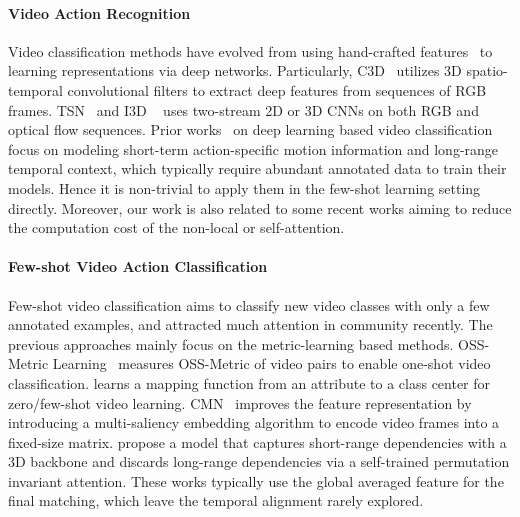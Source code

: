 \documentclass{article}
\begin{document}
\paragraph{Video Action Recognition}
Video classification methods have evolved from using
hand-crafted features~\cite{klaser2008spatio,scovanner20073,wang2013action} to learning representations via deep networks. Particularly,
C3D~\cite{tran2015learning} utilizes 3D spatio-temporal convolutional filters to extract deep features from sequences of RGB frames. TSN~\cite{wang2016temporal} and I3D ~\cite{carreira2017quo} uses two-stream 2D or 3D CNNs on both RGB and optical flow sequences. 
Prior works~\cite{wang2016temporal,tran2015learning} on deep learning based video classification focus on modeling short-term action-specific motion information and long-range temporal context\cite{wang2018non,wang2016temporal,carreira2017quo}, which typically require abundant annotated data to train their models. Hence it is non-trivial to apply them in the few-shot learning setting directly. Moreover, our work is also related to some recent works aiming to reduce the computation cost of the non-local or self-attention\cite{chen2019graph,zhang2019latentgnn}.





\paragraph{Few-shot Video Action Classification}
Few-shot video classification aims to classify new video classes with only a few annotated examples, and attracted much attention in community recently. The previous approaches mainly focus on the metric-learning based methods.
OSS-Metric Learning~\cite{kliper2011one} measures OSS-Metric of video pairs to enable one-shot video classification. \cite{mishra2018generative} learns a mapping function from an attribute to a class center for zero/few-shot video learning. CMN~\cite{zhu2018compound} improves the feature representation by introducing a multi-saliency embedding algorithm to encode video frames into a fixed-size matrix. \cite{zhang2020few} propose a model that captures short-range dependencies with a 3D backbone and discards long-range dependencies via a self-trained permutation invariant attention. These works typically use the global averaged feature for the final matching, which leave the temporal alignment rarely explored.
\end{document}

